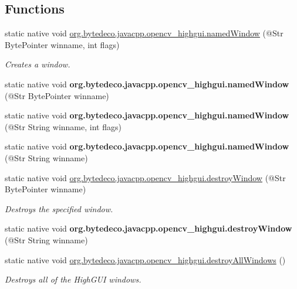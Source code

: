 \subsection*{Functions}
\begin{DoxyCompactItemize}
\item 
static native void \hyperlink{group__highgui_gad8dcfc13dd30b1339b3fc7fb3fb19603}{org.\+bytedeco.\+javacpp.\+opencv\+\_\+highgui.\+named\+Window} (@Str Byte\+Pointer winname, int flags)
\begin{DoxyCompactList}\small\item\em Creates a window. \end{DoxyCompactList}\item 
\mbox{\label{group__highgui_gaf852752225836fd4c3f46a3d81c99bca}} 
static native void {\bfseries org.\+bytedeco.\+javacpp.\+opencv\+\_\+highgui.\+named\+Window} (@Str Byte\+Pointer winname)
\item 
\mbox{\label{group__highgui_gada2840bb3f4c9130254bf7a3a10a778a}} 
static native void {\bfseries org.\+bytedeco.\+javacpp.\+opencv\+\_\+highgui.\+named\+Window} (@Str String winname, int flags)
\item 
\mbox{\label{group__highgui_gae812da89b4f775e07322dc846d112bd8}} 
static native void {\bfseries org.\+bytedeco.\+javacpp.\+opencv\+\_\+highgui.\+named\+Window} (@Str String winname)
\item 
static native void \hyperlink{group__highgui_ga3fd651e0fd7a9c3d290d4217cdcebbcf}{org.\+bytedeco.\+javacpp.\+opencv\+\_\+highgui.\+destroy\+Window} (@Str Byte\+Pointer winname)
\begin{DoxyCompactList}\small\item\em Destroys the specified window. \end{DoxyCompactList}\item 
\mbox{\label{group__highgui_ga63e73d97cd533b9f11473db651404144}} 
static native void {\bfseries org.\+bytedeco.\+javacpp.\+opencv\+\_\+highgui.\+destroy\+Window} (@Str String winname)
\item 
static native void \hyperlink{group__highgui_gaff06efa4a5f234c304b6f498075abd1a}{org.\+bytedeco.\+javacpp.\+opencv\+\_\+highgui.\+destroy\+All\+Windows} ()
\begin{DoxyCompactList}\small\item\em Destroys all of the High\+G\+UI windows. \end{DoxyCompactList}\item 

\end{DoxyCompactItemize}
